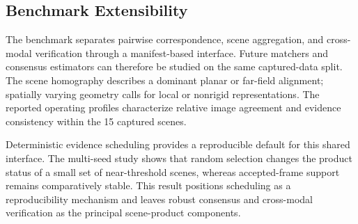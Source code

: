 \subsection{Benchmark Extensibility}

The benchmark separates pairwise correspondence, scene aggregation, and cross-modal verification
through a manifest-based interface. Future matchers and consensus estimators can therefore be
studied on the same captured-data split. The scene homography describes a dominant planar or
far-field alignment; spatially varying geometry calls for local or nonrigid representations.
The reported operating profiles characterize relative image agreement and evidence consistency
within the 15 captured scenes.

Deterministic evidence scheduling provides a reproducible default for this shared interface. The
multi-seed study shows that random selection changes the product status of a small set of
near-threshold scenes, whereas accepted-frame support remains comparatively stable. This result
positions scheduling as a reproducibility mechanism and leaves robust consensus and cross-modal
verification as the principal scene-product components.
